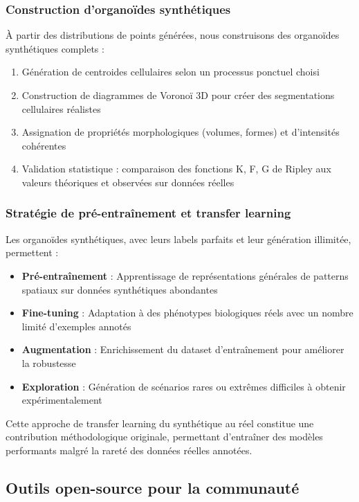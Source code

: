\subsubsection{Construction d'organoïdes synthétiques}

À partir des distributions de points générées, nous construisons des organoïdes synthétiques complets :
\begin{enumerate}
    \item Génération de centroides cellulaires selon un processus ponctuel choisi
    \item Construction de diagrammes de Voronoï 3D pour créer des segmentations cellulaires réalistes
    \item Assignation de propriétés morphologiques (volumes, formes) et d'intensités cohérentes
    \item Validation statistique : comparaison des fonctions K, F, G de Ripley aux valeurs théoriques et observées sur données réelles
\end{enumerate}

\subsubsection{Stratégie de pré-entraînement et transfer learning}

Les organoïdes synthétiques, avec leurs labels parfaits et leur génération illimitée, permettent :
\begin{itemize}
    \item \textbf{Pré-entraînement} : Apprentissage de représentations générales de patterns spatiaux sur données synthétiques abondantes
    \item \textbf{Fine-tuning} : Adaptation à des phénotypes biologiques réels avec un nombre limité d'exemples annotés
    \item \textbf{Augmentation} : Enrichissement du dataset d'entraînement pour améliorer la robustesse
    \item \textbf{Exploration} : Génération de scénarios rares ou extrêmes difficiles à obtenir expérimentalement
\end{itemize}

Cette approche de transfer learning du synthétique au réel constitue une contribution méthodologique originale, permettant d'entraîner des modèles performants malgré la rareté des données réelles annotées.

\subsection{Outils open-source pour la communauté}

